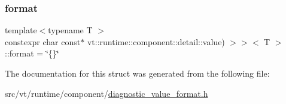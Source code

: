 \subsubsection{\texorpdfstring{format}{format}}
{\footnotesize\ttfamily template$<$typename T $>$ \\
constexpr char const$\ast$ vt\+::runtime\+::component\+::detail\+::value) $>$$>$$<$ T $>$\+::format = \char`\"{}\{\}\char`\"{}\hspace{0.3cm}{\ttfamily [static]}}



The documentation for this struct was generated from the following file\+:\begin{DoxyCompactItemize}
\item 
src/vt/runtime/component/\hyperlink{diagnostic__value__format_8h}{diagnostic\+\_\+value\+\_\+format.\+h}\end{DoxyCompactItemize}
